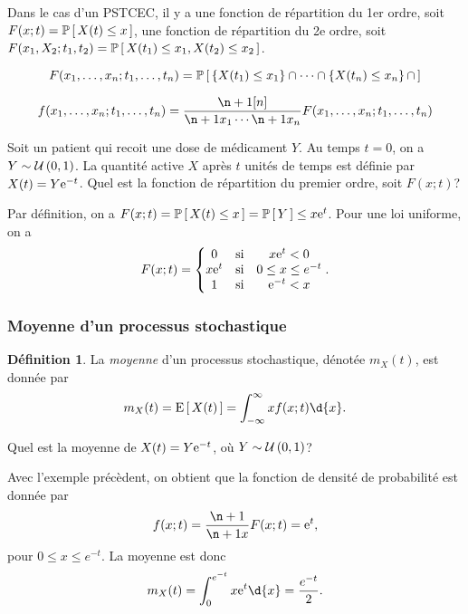 \documentclass[11pt]{article}
\makeatletter
\renewcommand\P[1]{%
	\ensuremath{%
		\mathbb{P}\left[\,#1\,\right]%
	}%
}%
\newcommand\e{%
	\ensuremath{%
		\mathrm{e}%
	}%
}%
\newcommand\Uni[2]{%
	\ensuremath{%
		\mathcal{U}\left(#1,#2\right)%
	}%
}%
\newcommand\Esp[1]{%
	\ensuremath{%
		\mathrm{E}\left[\,#1\,\right]%
	}%
}%
\theoremstyle{remark}
\theoremstyle{definition}
\newtheorem*{@definition}{Définition}
\newenvironment{definition}{%
	\begin{@definition}%
}{%
	\end{@definition}%
	\setcounter{property}{0}%
}
\makeatother
\begin{document}
Dans le cas d'un PSTCEC, il y a une fonction de répartition du 1er ordre, soit
$F(x;t)=\P{X(t)\leq x}$, une fonction de répartition du 2e ordre, soit
$F(x_1,X_2;t_1,t_2)=\P{X(t_1)\leq x_1,X(t_2)\leq x_2}$.

\begin{equation*}
	F(x_1,\dots,x_n;t_1,\dots,t_n)=\P{
		\left\{X(t_1)\leq x_1\right\}\cap\cdots\cap
		\left\{X(t_n)\leq x_n\right\}\cap
	}
\end{equation*}

\begin{equation*}
	f(x_1,\dots,x_n;t_1,\dots,t_n)=\frac{\p[n]{}}{\p{x_1}\cdots\p{x_n}}
		F(x_1,\dots,x_n;t_1,\dots,t_n)
\end{equation*}

\begin{exemple}
	Soit un patient qui recoit une dose de médicament $Y$. Au temps $t=0$, on
	a $Y\sim\Uni{0}{1}$. La quantité active $X$ après $t$ unités de temps est
	définie par $X(t)=Y\e^{-t}$. Quel est la fonction de répartition du
	premier ordre, soit $F(x;t)$?

	Par définition, on a $F(x;t)=\P{X(t)\leq x}=\P{Y}\leq x\e^t$. Pour une loi
	uniforme, on a
	\begin{equation*}
		F(x;t)=\left\{
			\begin{matrix}
				0     &\text{si}& x\e^t<0\\
				x\e^t &\text{si}& 0\leq x\leq e^{-t}\\
				1     &\text{si}& \e^{-t}<x\\
			\end{matrix}
		\right..
	\end{equation*}
\end{exemple}

\subsubsection{Moyenne d'un processus stochastique}
\begin{definition}
	La \textit{moyenne} d'un processus stochastique, dénotée $m_X(t)$, est
	donnée par
	\begin{equation*}
		m_X(t)=\Esp{X(t)}=\int_{-\infty}^\infty xf(x;t)\d{x}.
	\end{equation*}
\end{definition}

\begin{exemple}
	Quel est la moyenne de $X(t)=Y\e^{-t}$, où $Y\sim\Uni{0}{1}$?

	Avec l'exemple précèdent, on obtient que la fonction de densité de
	probabilité est donnée par
	\begin{equation*}
		f(x;t)=\frac{\p{}}{\p{x}}F(x;t)=\e^t,
	\end{equation*}
	pour $0\leq x\leq e^{-t}$. La moyenne est donc
	\begin{equation*}
		m_X(t)=\int_0^{e^{-t}}x\e^t\d{x}=\frac{e^{-t}}{2}.
	\end{equation*}
\end{exemple}
\end{document}
